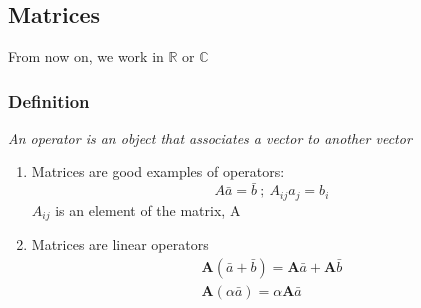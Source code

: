 \documentclass[a4paper, 11pt, normalem]{report}
\newcommand\R{\mathbb{R}}
\begin{document}
\chapter{}
\section{Matrices}
From now on, we work in $\R$ or $\mathbb{C}$

\subsection{Definition}
\emph{An operator is an object that associates a vector to another vector}
\begin{enumerate}
    \item Matrices are good examples of operators:
            \begin{equation*}
                A\bar{a} = \bar{b} ~;~ A_{ij}a_j = b_i
            \end{equation*}
          $A_{ij}$ is an element of the matrix, A
    \item Matrices are linear operators
            \begin{gather*}
                \mathbf{A}(\bar{a} + \bar{b}) = \mathbf{A}\bar{a} + \mathbf{A}\bar{b} \\
                \mathbf{A}(\alpha\bar{a}) = \alpha \mathbf{A}\bar{a}
            \end{gather*}
\end{enumerate}
\end{document}
